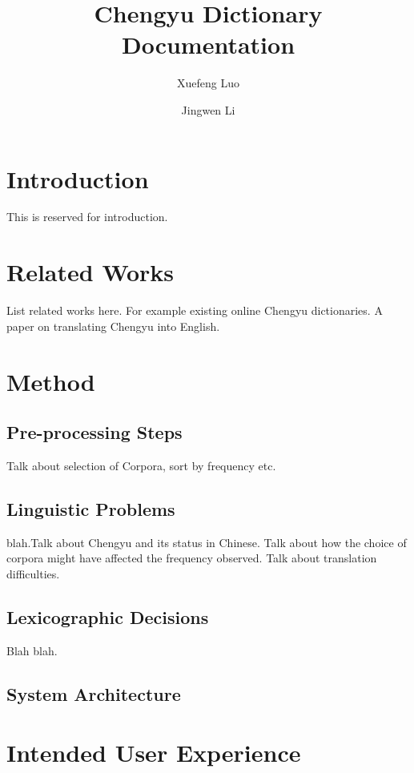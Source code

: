 \documentclass[11pt]{article} %
\title{Chengyu Dictionary Documentation} %
\author{Xuefeng Luo \and Jingwen Li}
\date{}	%
\begin{document}
\maketitle

\section{Introduction}
\indent This is reserved for introduction.

\section{Related Works}
\indent List related works here. For example existing online Chengyu dictionaries. A paper on translating Chengyu into English.

\section{Method}
\subsection{Pre-processing Steps}
\indent Talk about selection of Corpora, sort by frequency etc.\\

\subsection{Linguistic Problems}

\indent blah.Talk about Chengyu and its status in Chinese. Talk about how the choice of corpora might have affected the frequency observed. Talk about translation difficulties.\\

\subsection{Lexicographic Decisions}

\indent Blah blah.\\

\subsection{System Architecture}

\section{Intended User Experience}
\end{document}
